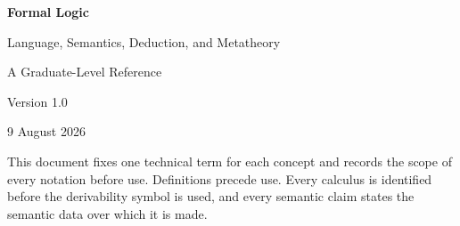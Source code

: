 
\hypersetup{pageanchor=false}
\begin{titlepage}
  \centering
  \vspace*{2.2cm}
  {\Huge\bfseries Formal Logic\par}
  \vspace{0.6cm}
  {\LARGE Language, Semantics, Deduction, and Metatheory\par}
  \vspace{1.2cm}
  {\Large A Graduate-Level Reference\par}
  \vfill
  {\large Version 1.0\par}
  \vspace{0.2cm}
  {\large 9 August 2026\par}
  \vfill
  \begin{minipage}{0.82\textwidth}
  \small
  This document fixes one technical term for each concept and records the scope
  of every notation before use.  Definitions precede use.
  Every calculus is identified before the derivability symbol is used, and
  every semantic claim states the semantic data over which it is made.
  \end{minipage}
\end{titlepage}

\frontmatter
\hypersetup{pageanchor=true}

